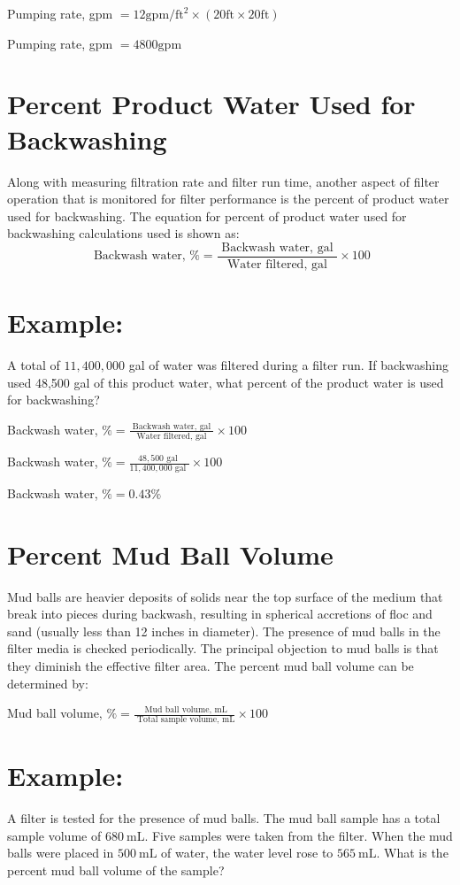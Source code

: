 \documentclass[10pt]{article}
\begin{document}
Pumping rate, gpm $=12 \mathrm{gpm} / \mathrm{ft}^{2} \times(20 \mathrm{ft} \times 20 \mathrm{ft})$

Pumping rate, gpm $=4800 \mathrm{gpm}$

\section{Percent Product Water Used for Backwashing}
Along with measuring filtration rate and filter run time, another aspect of filter operation that is monitored for filter performance is the percent of product water used for backwashing. The equation for percent of product water used for backwashing calculations used is shown as:
$$
\text { Backwash water, } \%=\frac{\text { Backwash water, gal }}{\text { Water filtered, gal }} \times 100
$$

\section{Example:}
A total of $11,400,000$ gal of water was filtered during a filter run. If backwashing used 48,500 gal of this product water, what percent of the product water is used for backwashing?

Backwash water, $\%=\frac{\text { Backwash water, gal }}{\text { Water filtered, gal }} \times 100$

Backwash water, $\%=\frac{48,500 \text { gal }}{11,400,000 \text { gal }} \times 100$

Backwash water, $\%=0.43 \%$

\section{Percent Mud Ball Volume}
Mud balls are heavier deposits of solids near the top surface of the medium that break into pieces during backwash, resulting in spherical accretions of floc and sand (usually less than 12 inches in diameter). The presence of mud balls in the filter media is checked periodically. The principal objection to mud balls is that they diminish the effective filter area. The percent mud ball volume can be determined by:

Mud ball volume, $\%=\frac{\text { Mud ball volume, } \mathrm{mL}}{\text { Total sample volume, } \mathrm{mL}} \times 100$

\section{Example:}
A filter is tested for the presence of mud balls. The mud ball sample has a total sample volume of $680 \mathrm{~mL}$. Five samples were taken from the filter. When the mud balls were placed in $500 \mathrm{~mL}$ of water, the water level rose to $565 \mathrm{~mL}$. What is the percent mud ball volume of the sample?
\end{document}
